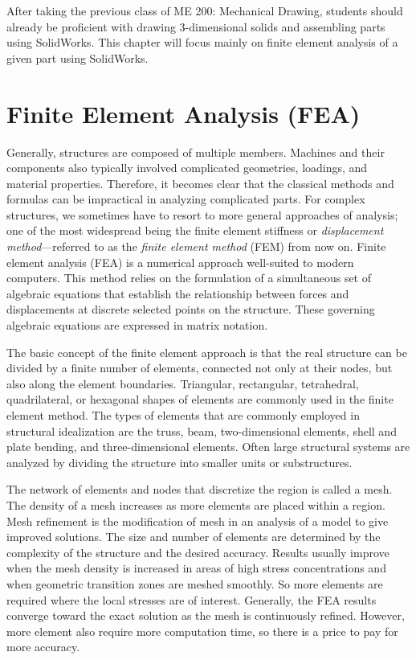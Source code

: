 \documentclass[a4paper,openany,12pt]{book}
\begin{document}
{{After taking the previous class of ME 200: Mechanical Drawing, students
should already be proficient with drawing 3-dimensional solids and
assembling parts using SolidWorks. This chapter will focus mainly on
finite element analysis of a given part using SolidWorks.

\section{Finite Element Analysis (FEA)}
\label{finite-element-analysis-fea}
Generally, structures are composed of multiple members. Machines and
their components also typically involved complicated geometries,
loadings, and material properties. Therefore, it becomes clear that the
classical methods and formulas can be impractical in analyzing
complicated parts. For complex structures, we sometimes have to resort
to more general approaches of analysis; one of the most widespread being
the finite element stiffness or \emph{displacement method}---referred to as
the \emph{finite element method} (FEM) from now on. Finite element analysis
(FEA) is a numerical approach well-suited to modern computers. This
method relies on the formulation of a simultaneous set of algebraic
equations that establish the relationship between forces and
displacements at discrete selected points on the structure. These
governing algebraic equations are expressed in matrix notation.

The basic concept of the finite element approach is that the real
structure can be divided by a finite number of elements, connected not
only at their nodes, but also along the element boundaries. Triangular,
rectangular, tetrahedral, quadrilateral, or hexagonal shapes of elements
are commonly used in the finite element method. The types of elements
that are commonly employed in structural idealization are the truss,
beam, two-dimensional elements, shell and plate bending, and
three-dimensional elements. Often large structural systems are analyzed
by dividing the structure into smaller units or substructures.

The network of elements and nodes that discretize the region is called a
mesh. The density of a mesh increases as more elements are placed within
a region. Mesh refinement is the modification of mesh in an analysis of
a model to give improved solutions. The size and number of elements are
determined by the complexity of the structure and the desired accuracy.
Results usually improve when the mesh density is increased in areas of
high stress concentrations and when geometric transition zones are
meshed smoothly. So more elements are required where the local stresses
are of interest. Generally, the FEA results converge toward the exact
solution as the mesh is continuously refined. However, more element also
require more computation time, so there is a price to pay for more
accuracy.

}}
\end{document}
